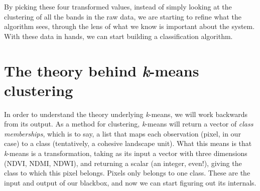 \documentclass[
  letterpaper,
]{scrbook}
\begin{document}
\begin{figure}[bt]



\end{figure}%

By picking these four transformed values, instead of simply looking at
the clustering of all the bands in the raw data, we are starting to
refine what the algorithm sees, through the lens of what we know is
important about the system. With these data in hands, we can start
building a classification algorithm.

\section{\texorpdfstring{The theory behind \emph{k}-means
clustering}{The theory behind k-means clustering}}\label{the-theory-behind-k-means-clustering}

In order to understand the theory underlying \emph{k}-means, we will
work backwards from its output. As a method for clustering,
\emph{k}-means will return a vector of \emph{class memberships}, which
is to say, a list that maps each observation (pixel, in our case) to a
class (tentatively, a cohesive landscape unit). What this means is that
\emph{k}-means is a transformation, taking as its input a vector with
three dimensions (NDVI, NDMI, NDWI), and returning a scalar (an integer,
even!), giving the class to which this pixel belongs. Pixels only
belongs to one class. These are the input and output of our blackbox,
and now we can start figuring out its internals.
\end{document}
